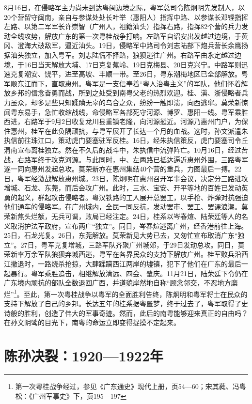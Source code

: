 8月16日，在侵略军主力尚未到达粤闽边境之际，粤军总司令陈炯明先发制人，以20个营留守闽南，亲自与参谋处处长叶举（惠阳人）指挥中路、以参谋长邓铿指挥左路、以第二军军长许崇智（广州人，祖籍汕头）指挥右路，指挥82个营的兵力发动全线攻势，解放广东的第一次粤桂战争打响。左路军自诏安出发越过边境，于黄冈、澄海大破敌军，逼近汕头。19日，侵略军中路司令刘志陆部下炮兵营长余鹰扬据汕头独立，加入粤军。刘志陆慌不择路，狼狈逃往广州。右路军由永定越过边境，于16日当天解放大埔、17日克复蕉岭、19日克梅县、20日克兴宁。中路军则迅速克复潮安、饶平，进至高坡、丰顺一带。至26日，粤东潮梅地区已全部解放。粤军顺东江而下，直取惠州。粤军是一支信奉着“粤人治粤主义”的军队，他们怀着解放乡邦的信念奋勇而战，所到之处受到南粤父老的热烈欢迎。桂、滇、浙侵略者兵力虽众，却多是些只知蹂躏无辜的乌合之众，纷纷一触即溃，向西逃窜。莫荣新惊闻粤东易手，急忙收缩战线，命侵略军各部死守河源、博罗、惠阳一线。粤军乘胜西进，右路军于9月2日收复龙川县重镇老隆，向河源挺近。河源乃惠州门户，为保住惠州，桂军在此负隅顽抗，与粤军展开了长达一个月的血战。这时，孙文派遣朱执信前往珠江口，策动虎门要塞驻军反桂。16日，经朱执信策反，虎门要塞司令丘渭南宣布离桂独立。然在不久后的战斗中，朱执信中流弹阵亡。10月16日，经过苦战，右路军终于攻克河源。与此同时，中、左两路已抵达逼近惠州外围，三路粤军遂一同向惠州发起总攻。莫荣新亦在惠州集结40个营的重兵，力图最后一搏。22日，粤军经激战解放惠州城。23日，陈炯明在惠州召开军事会议，决定分三路进攻增城、石龙、东莞，而后会攻广州。此时，三水、宝安、开平等地的百姓已发动英勇的起义，群起攻击侵略者。粤汉铁路的工人展开总罢工，以手枪、炸弹对抗强迫他们通车的侵略军。在广州城内，全民一同反抗，发动罢市、罢工、罢课浪潮。莫荣新焦头烂额，无兵可调，败局已经注定。24日，桂系以岑春煊、陆荣廷等人的名义取消护法军政府，宣布两广“独立”。同日，岑春煊逃离广州，经香港前往上海。25日，石龙光复。26日，东莞解放。莫荣新见大势已去，又匆忙宣布取消广东“独立”。27日，粤军克复增城，三路军队齐聚广州城郊，于29日发动总攻。同日，莫荣新率万余军队狼狈弃城西逃，粤军在各界民众的支持下解放广州。桂军败兵沿西江撤退时，一路烧杀抢掠，大肆蹂躏西江两岸的墟镇，犯下了他们在广东的最后一起暴行。粤军乘胜追击，相继解放清远、四会、肇庆。11月21日，陆荣廷下令仍在广东境内顽抗的部队全数退回广西，并道貌岸然地自称“顾念邻交，不忍地方糜烂”\footnote{第一次粤桂战争经过，参见《广东通史》现代上册，页54—60；宋其蕤、冯粤松：《广州军事史》下，页195—197}。至此，第一次粤桂战争以粤军的全面胜利告终，陈炯明和粤军将士在民众的支持下解放了自己的乡邦。长达五年的桂系据粤噩梦，终于过去了，粤军取得了史诗般的胜利，创造了伟大的军事奇迹。然而，此后的南粤能够迎来真正的自由吗？在孙文阴骘的目光下，南粤的命运立即变得捉摸不定起来。

\section{陈孙决裂：1920—1922年}

